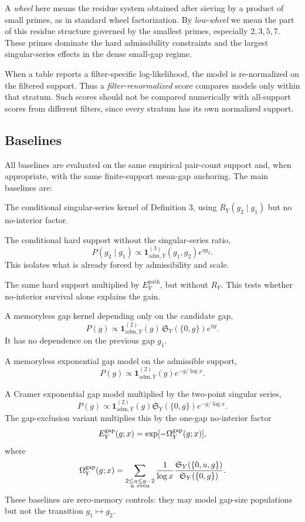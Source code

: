 \documentclass[10pt]{article}
\newcommand{\SY}{\mathfrak{S}_Y}
\begin{document}
A \emph{wheel} here means the residue system obtained after sieving by a product of small primes, as in standard wheel factorization.  By \emph{low-wheel} we mean the part of this residue structure governed by the smallest primes, especially $2,3,5,7$.  These primes dominate the hard admissibility constraints and the largest singular-series effects in the dense small-gap regime.

When a table reports a filter-specific log-likelihood, the model is re-normalized on the filtered support.  Thus a \emph{filter-renormalized} score compares models only within that stratum.  Such scores should not be compared numerically with all-support scores from different filters, since every stratum has its own normalized support.

\subsection{Baselines}
All baselines are evaluated on the same empirical pair-count support and, when appropriate, with the same finite-support mean-gap anchoring.  The main baselines are:
\begin{description}[leftmargin=1.5em]
\item[CHL1 ratio-only.] The conditional singular-series kernel of Definition 3, using $R_Y(g_2\mid g_1)$ but no no-interior factor.
\item[Mask-only conditional support.] The conditional hard support without the singular-series ratio,
\[
P(g_2\mid g_1)\propto \mathbf 1_{\mathrm{adm},Y}^{(3)}(g_1,g_2)e^{\eta g_2}.
\]
This isolates what is already forced by admissibility and scale.
\item[Mask-only with no-interior exclusion.] The same hard support multiplied by $E_Y^{\mathrm{path}}$, but without $R_Y$.  This tests whether no-interior survival alone explains the gain.
\item[Order-zero HL2.] A memoryless gap kernel depending only on the candidate gap,
\[
P(g)\propto \mathbf 1_{\mathrm{adm},Y}^{(2)}(g)\,\SY(\{0,g\})e^{\eta g}.
\]
It has no dependence on the previous gap $g_1$.
\item[Cramer order-zero \cite{cramer1936}.] A memoryless exponential gap model on the admissible support,
\[
P(g)\propto \mathbf 1_{\mathrm{adm},Y}^{(2)}(g)e^{-g/\log x}.
\]
\item[Cramer--Granville order-zero \cite{granville1995}.] A Cramer exponential gap model multiplied by the two-point singular series,
\[
P(g)\propto \mathbf 1_{\mathrm{adm},Y}^{(2)}(g)\SY(\{0,g\})e^{-g/\log x}.
\]
The gap-exclusion variant multiplies this by the one-gap no-interior factor
\[
E_Y^{\rm gap}(g;x)=\exp[-\Omega_Y^{\rm gap}(g;x)],
\]
where
\[
\Omega_Y^{\rm gap}(g;x)=\sum_{\substack{2\le u\le g-2\\u\ \mathrm{even}}}\frac{1}{\log x}\frac{\SY(\{0,u,g\})}{\SY(\{0,g\})}.
\]
These baselines are zero-memory controls: they may model gap-size populations but not the transition $g_1\mapsto g_2$.
\end{description}
\end{document}
